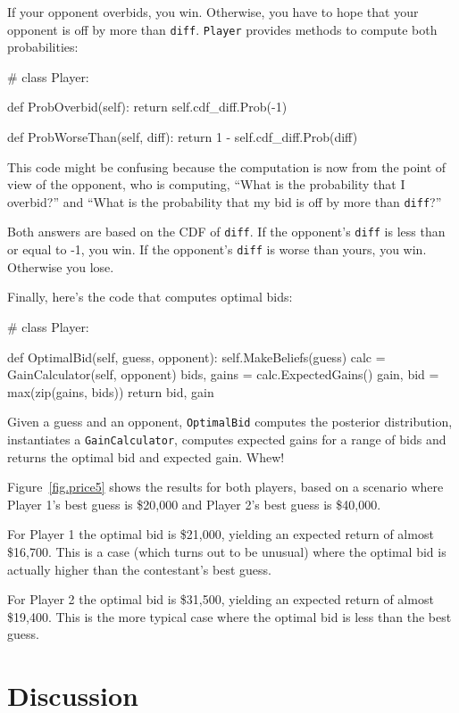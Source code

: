 \documentclass[12pt]{book}
\theoremstyle{exercise}
\begin{document}
If your opponent overbids, you win.  Otherwise, you have to hope
that your opponent is off by more than {\tt diff}.  {\tt Player}
provides methods to compute both probabilities:

\begin{code}
# class Player:

    def ProbOverbid(self):
        return self.cdf_diff.Prob(-1)

    def ProbWorseThan(self, diff):
        return 1 - self.cdf_diff.Prob(diff)
\end{code}

This code might be confusing because the computation is now from
the point of view of the opponent, who is computing, ``What is
the probability that I overbid?'' and ``What is the probability
that my bid is off by more than {\tt diff}?''

Both answers are based on the CDF of {\tt diff}.  If the opponent's
{\tt diff} is less than or equal to -1, you win.  If the opponent's
{\tt diff} is worse than yours, you win.  Otherwise you lose.

Finally, here's the code that computes optimal bids:

\begin{code}
# class Player:

    def OptimalBid(self, guess, opponent):
        self.MakeBeliefs(guess)
        calc = GainCalculator(self, opponent)
        bids, gains = calc.ExpectedGains()
        gain, bid = max(zip(gains, bids))
        return bid, gain
\end{code}

Given a guess and an opponent, {\tt OptimalBid} computes
the posterior distribution, instantiates a {\tt GainCalculator},
computes expected gains for a range of bids and returns
the optimal bid and expected gain.  Whew!

Figure~\ref{fig.price5} shows the results for both players,
based on a scenario where Player 1's best guess is \$20,000
and Player 2's best guess is \$40,000.

For Player 1 the optimal bid is \$21,000, yielding an expected
return of almost \$16,700.  This is a case (which turns out
to be unusual) where the optimal bid is actually higher than
the contestant's best guess.

For Player 2 the optimal bid is \$31,500, yielding an expected
return of almost \$19,400.  This is the more typical case where
the optimal bid is less than the best guess.


\section{Discussion}
\end{document}
